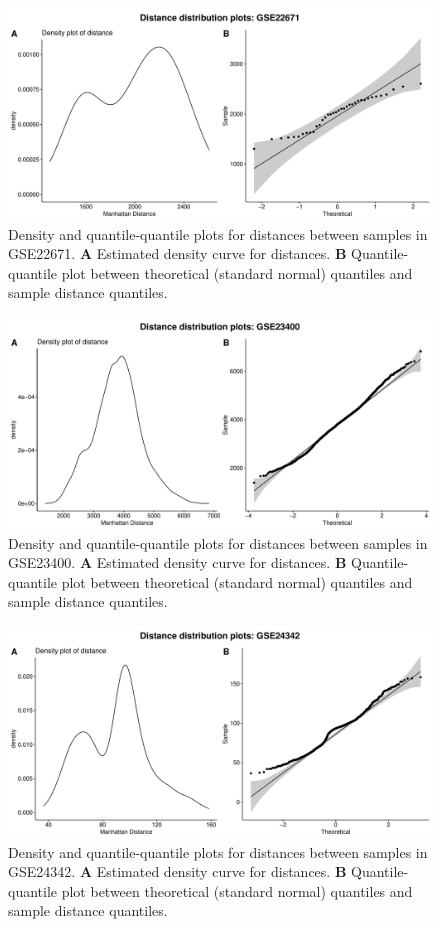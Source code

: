 \documentclass[10pt,letterpaper]{article}\usepackage[]{graphicx}\usepackage[]{color}
\begin{document}
\begin{figure}[H]
	\includegraphics[width=\textwidth]{manhattan-distance_hist_GSE22671.pdf}
	\caption{Density and quantile-quantile plots for distances between samples in GSE22671. \textbf{A} Estimated density curve for distances. \textbf{B} Quantile-quantile plot between theoretical (standard normal) quantiles and sample distance quantiles.}
\end{figure}

\begin{figure}[H]
	\includegraphics[width=\textwidth]{manhattan-distance_hist_GSE23400.pdf}
	\caption{Density and quantile-quantile plots for distances between samples in GSE23400. \textbf{A} Estimated density curve for distances. \textbf{B} Quantile-quantile plot between theoretical (standard normal) quantiles and sample distance quantiles.}
\end{figure}

\begin{figure}[H]
	\includegraphics[width=\textwidth]{manhattan-distance_hist_GSE24342.pdf}
	\caption{Density and quantile-quantile plots for distances between samples in GSE24342. \textbf{A} Estimated density curve for distances. \textbf{B} Quantile-quantile plot between theoretical (standard normal) quantiles and sample distance quantiles.}
\end{figure}
\end{document}
